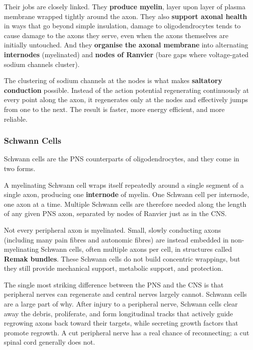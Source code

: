 \documentclass[11pt]{article}
\begin{document}
Their jobs are closely linked. They \textbf{produce myelin}, layer upon layer of plasma membrane wrapped tightly around the axon. They also \textbf{support axonal health} in ways that go beyond simple insulation, damage to oligodendrocytes tends to cause damage to the axons they serve, even when the axons themselves are initially untouched. And they \textbf{organise the axonal membrane} into alternating \textbf{internodes} (myelinated) and \textbf{nodes of Ranvier} (bare gaps where voltage-gated sodium channels cluster).

The clustering of sodium channels at the nodes is what makes \textbf{saltatory conduction} possible. Instead of the action potential regenerating continuously at every point along the axon, it regenerates only at the nodes and effectively jumps from one to the next. The result is faster, more energy efficient, and more reliable.

\subsubsection{Schwann Cells}

Schwann cells are the PNS counterparts of oligodendrocytes, and they come in two forms.

A myelinating Schwann cell wraps itself repeatedly around a single segment of a single axon, producing one \textbf{internode} of myelin. One Schwann cell per internode, one axon at a time. Multiple Schwann cells are therefore needed along the length of any given PNS axon, separated by nodes of Ranvier just as in the CNS.

Not every peripheral axon is myelinated. Small, slowly conducting axons (including many pain fibres and autonomic fibres) are instead embedded in non-myelinating Schwann cells, often multiple axons per cell, in structures called \textbf{Remak bundles}. These Schwann cells do not build concentric wrappings, but they still provide mechanical support, metabolic support, and protection.

The single most striking difference between the PNS and the CNS is that peripheral nerves can regenerate and central nerves largely cannot. Schwann cells are a large part of why. After injury to a peripheral nerve, Schwann cells clear away the debris, proliferate, and form longitudinal tracks that actively guide regrowing axons back toward their targets, while secreting growth factors that promote regrowth. A cut peripheral nerve has a real chance of reconnecting; a cut spinal cord generally does not.
\end{document}
